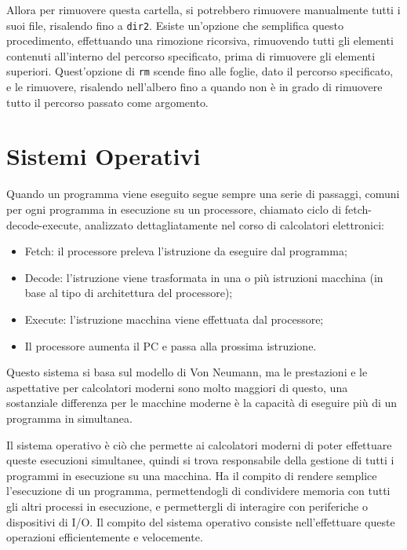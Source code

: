 \documentclass{article}
\numberwithin{equation}{subsection}
\begin{document}
Allora per rimuovere questa cartella, si potrebbero rimuovere manualmente tutti i suoi file, risalendo fino a \verb|dir2|. Esiste un'opzione che semplifica questo procedimento, effettuando una rimozione ricorsiva, 
rimuovendo tutti gli elementi contenuti all'interno del percorso specificato, prima di rimuovere gli elementi superiori. Quest'opzione di \verb|rm| scende fino alle foglie, dato il percorso specificato, e le rimuovere, 
risalendo nell'albero fino a quando non è in grado di rimuovere tutto il percorso passato come argomento. 



\clearpage

\section{Sistemi Operativi}

Quando un programma viene eseguito segue sempre una serie di passaggi, comuni per ogni programma in esecuzione su un processore, chiamato ciclo di fetch-decode-execute, 
analizzato dettagliatamente nel corso di calcolatori elettronici:
\begin{itemize}
  \item Fetch: il processore preleva l'istruzione da eseguire dal programma;
  \item Decode: l'istruzione viene trasformata in una o più istruzioni macchina (in base al tipo di architettura del processore);
  \item Execute: l'istruzione macchina viene effettuata dal processore;
  \item Il processore aumenta il PC e passa alla prossima istruzione. 
\end{itemize}
Questo sistema si basa sul modello di Von Neumann, ma le prestazioni e le aspettative per calcolatori 
moderni sono molto maggiori di questo, una sostanziale differenza per le macchine moderne è la capacità di eseguire più di un programma in simultanea. 

Il sistema operativo è ciò che permette ai calcolatori moderni di poter effettuare queste esecuzioni simultanee, quindi si trova responsabile della gestione di tutti i 
programmi in esecuzione su una macchina. 
Ha il compito di rendere semplice l'esecuzione di un programma, permettendogli di condividere memoria con tutti gli altri processi in esecuzione, e permettergli di 
interagire con periferiche o dispositivi di I/O. Il compito del sistema operativo consiste nell'effettuare queste operazioni efficientemente e velocemente. 
\end{document}

